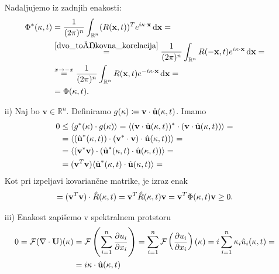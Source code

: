 \documentclass[mat2, tisk]{fmfdelo}
\newcommand{\R}{\mathbb R}
\newcommand{\bd}{\textbf}
\begin{document}
\begin{dokaz}
\begin{enumerate}
  Nadaljujemo iz zadnjih enakosti: 
  \begin{align*}
  \Phi^*(\text{\bd{$\kappa$}}, t) &= \frac{1}{(2\pi)^n} \int_{\R^n} ({R}(\bd{x}, t))^T e^{i\text{\bd{$\kappa$}} \cdot \bd{x}}\dif \bd{x} = \\
  &\stackrel{\ref{dvo_točkovna_korelacija}}{=} \frac{1}{(2\pi)^n} \int_{\R^n} {R}(-\bd{x}, t) e^{i\text{\bd{$\kappa$}} \cdot \bd{x}}\dif \bd{x} = \\
  &\stackrel{x\rightarrow -x}{=} \frac{1}{(2\pi)^n} \int_{\R^n} {R}(\bd{x}, t) e^{-i\text{\bd{$\kappa$}} \cdot \bd{x}}\dif \bd{x} = \\
  &= \Phi(\text{\bd{$\kappa$}}, t).
\end{align*}
\item[ii)] Naj bo $\bd{v} \in \R^n$. Definiramo $g(\text{\bd{$\kappa$}}) \coloneqq \bd{v} \cdot \hat{\bd{u}}(\text{\bd{$\kappa$}}, t)$.
Imamo 
\begin{align*} 
0 &\leq \langle g^*(\text{\bd{$\kappa$}}) \cdot g(\text{\bd{$\kappa$}}) \rangle = \langle (\bd{v} \cdot \hat{\bd{u}}(\text{\bd{$\kappa$}}, t))^* \cdot (\bd{v} \cdot \hat{\bd{u}}(\text{\bd{$\kappa$}}, t)) \rangle = \\
&= \langle (\hat{\bd{u}}^*(\text{\bd{$\kappa$}}, t))\cdot (\bd{v}^*\cdot \bd{v}) \cdot \hat{\bd{u}}(\text{\bd{$\kappa$}}, t)) \rangle = \\
&= \langle (\bd{v}^* \bd{v}) \cdot (\hat{\bd{u}}^*(\text{\bd{$\kappa$}}, t) \cdot \hat{\bd{u}}(\text{\bd{$\kappa$}}, t)) \rangle = \\
&= (\bd{v}^T \bd{v}) \langle \hat{\bd{u}}^*(\text{\bd{$\kappa$}}, t) \cdot \hat{\bd{u}}(\text{\bd{$\kappa$}}, t) \rangle =
\end{align*}
Kot pri izpeljavi kovariančne matrike, je izraz enak 
\begin{align*}
= (\bd{v}^T \bd{v}) \cdot \hat{R}(\text{\bd{$\kappa$}}, t) = \bd{v}^T \hat{R}(\text{\bd{$\kappa$}}, t) \bd{v} = \bd{v}^T \Phi(\text{\bd{$\kappa$}}, t) \bd{v} \geq 0.
\end{align*}
\item[iii)] Enakost zapišemo v spektralnem protstoru
\begin{align*}
  0 = \mathcal{F}(\nabla \cdot \bd{U})(\text{\bd{$\kappa$}}) &= \mathcal{F}\left(\sum_{i=1}^{n} \frac{\partial u_i}{\partial x_i} \right) = \sum_{i=1}^{n} \mathcal{F}\left(\frac{\partial u_i}{\partial x_i} \right)(\text{\bd{$\kappa$}}) = i\sum_{i=1}^{n} \text{\bd{$\kappa$}}_i \hat{u}_i(\text{\bd{$\kappa$}}, t) = \\
  &= i \text{\bd{$\kappa$}} \cdot \hat{\bd{u}}(\text{\bd{$\kappa$}}, t)

\end{align*}
\end{enumerate}
\end{dokaz}
\end{document}

